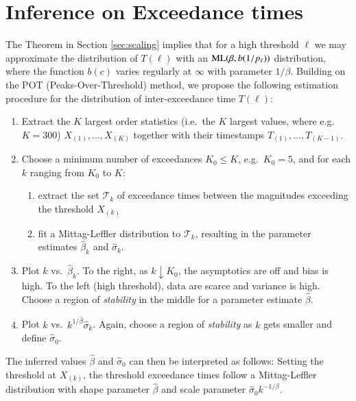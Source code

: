 \documentclass[]{elsarticle} %
\providecommand{\tightlist}{%
  \setlength{\itemsep}{0pt}\setlength{\parskip}{0pt}}
\begin{document}
\hypertarget{inference-on-exceedance-times}{%
\section{Inference on Exceedance
times}\label{inference-on-exceedance-times}}

The Theorem in Section \ref{sec:scaling} implies that for a high
threshold \(\ell\) we may approximate the distribution of \(T(\ell)\)
with an \({\rm ML}(\beta, b(1/p_{\ell}))\) distribution, where the
function \(b(c)\) varies regularly at \(\infty\) with parameter
\(1/\beta\). Building on the POT (Peaks-Over-Threshold) method, we
propose the following estimation procedure for the distribution of
inter-exceedance time \(T(\ell)\):

\begin{enumerate}
\def\labelenumi{\arabic{enumi}.}
\item
  Extract the \(K\) largest order statistics (i.e.~the \(K\) largest
  values, where e.g.~\(K = 300\)) \(X_{(1)}, \ldots, X_{(K)}\) together
  with their timestamps \(T_{(1)}, \ldots, T_{(K-1)}\).
\item
  Choose a minimum number of exceedances \(K_0\leq K\),
  e.g.~\(K_0 = 5\), and for each \(k\) ranging from \(K_0\) to \(K\):

  \begin{enumerate}
  \def\labelenumii{\alph{enumii})}
  \tightlist
  \item
    extract the set \(\mathcal T_k\) of exceedance times between the
    magnitudes exceeding the threshold \(X_{(k)}\)
  \item
    fit a Mittag-Leffler distribution to \(\mathcal T_k\), resulting in
    the parameter estimates \(\hat\beta_k\) and \(\hat \sigma_k\).
  \end{enumerate}
\item
  Plot \(k\) vs.~\(\hat \beta_k\). To the right, as
  \(k \downarrow K_0\), the asymptotics are off and bias is high. To the
  left (high threshold), data are scarce and variance is high. Choose a
  region of \emph{stability} in the middle for a parameter estimate
  \(\hat \beta\).
\item
  Plot \(k\) vs.~\(k^{1/\hat \beta} \hat \sigma_k\). Again, choose a
  region of \emph{stability} as \(k\) gets smaller and define
  \(\hat \sigma_0\).
\end{enumerate}

The inferred values \(\hat \beta\) and \(\hat \sigma_0\) can then be
interpreted as follows: Setting the threshold at \(X_{(k)}\), the
threshold exceedance times follow a Mittag-Leffler distribution with
shape parameter \(\hat \beta\) and scale parameter
\(\hat \sigma_0 k^{-1/\beta}\).
\end{document}
